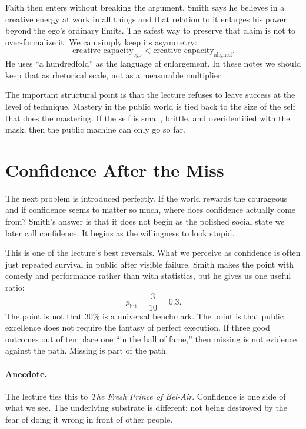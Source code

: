 Faith then enters without breaking the argument. Smith says he believes in a creative energy at work in all things and that relation to it enlarges his power beyond the ego's ordinary limits. The safest way to preserve that claim is not to over-formalize it. We can simply keep its asymmetry:
\begin{equation}
\text{creative capacity}_{\mathrm{ego}}
<
\text{creative capacity}_{\mathrm{aligned}}.
\end{equation}
He uses ``a hundredfold'' as the language of enlargement. In these notes we should keep that as rhetorical scale, not as a measurable multiplier.

The important structural point is that the lecture refuses to leave success at the level of technique. Mastery in the public world is tied back to the size of the self that does the mastering. If the self is small, brittle, and overidentified with the mask, then the public machine can only go so far.

\section{Confidence After the Miss}

The next problem is introduced perfectly. If the world rewards the courageous and if confidence seems to matter so much, where does confidence actually come from? Smith's answer is that it does not begin as the polished social state we later call confidence. It begins as the willingness to look stupid.

This is one of the lecture's best reversals. What we perceive as confidence is often just repeated survival in public after visible failure. Smith makes the point with comedy and performance rather than with statistics, but he gives us one useful ratio:
\begin{equation}
p_{\text{hit}}=\frac{3}{10}=0.3.
\end{equation}
The point is not that \(30\%\) is a universal benchmark. The point is that public excellence does not require the fantasy of perfect execution. If three good outcomes out of ten place one ``in the hall of fame,'' then missing is not evidence against the path. Missing is part of the path.

\paragraph{Anecdote.}
The lecture ties this to \emph{The Fresh Prince of Bel-Air}. Confidence is one side of what we see. The underlying substrate is different: not being destroyed by the fear of doing it wrong in front of other people.

